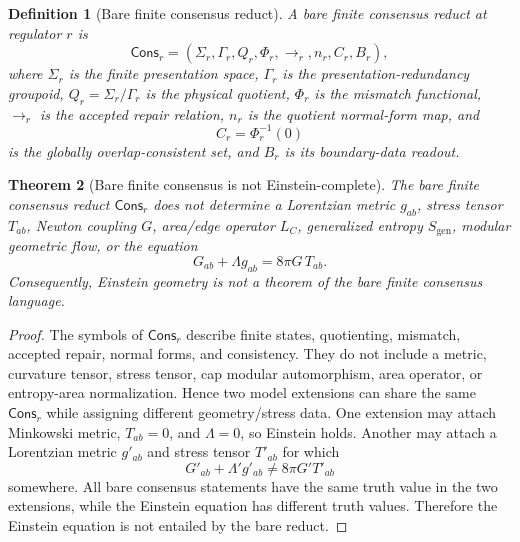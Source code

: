 \documentclass[11pt]{article}
\newtheorem{theorem}{Theorem}[section]
\newtheorem{definition}[theorem]{Definition}
\theoremstyle{remark}
\theoremstyle{plain}
\begin{document}
\begin{definition}[Bare finite consensus reduct]\label{def:bare-finite-consensus-reduct}
A bare finite consensus reduct at regulator \(r\) is
\[
\mathsf{Cons}_r
=
(\Sigma_r,\Gamma_r,Q_r,\Phi_r,\to_r,n_r,C_r,B_r),
\]
where \(\Sigma_r\) is the finite presentation space, \(\Gamma_r\) is the
presentation-redundancy groupoid, \(Q_r=\Sigma_r/\Gamma_r\) is the physical
quotient, \(\Phi_r\) is the mismatch functional, \(\to_r\) is the accepted
repair relation, \(n_r\) is the quotient normal-form map, and
\[
C_r=\Phi_r^{-1}(0)
\]
is the globally overlap-consistent set, and \(B_r\) is its boundary-data
readout.
\end{definition}

\begin{theorem}[Bare finite consensus is not Einstein-complete]
\label{thm:bare-consensus-not-einstein-complete}
The bare finite consensus reduct \(\mathsf{Cons}_r\) does not determine a
Lorentzian metric \(g_{ab}\), stress tensor \(T_{ab}\), Newton coupling \(G\),
area/edge operator \(L_C\), generalized entropy \(S_{\mathrm{gen}}\), modular
geometric flow, or the equation
\[
G_{ab}+\Lambda g_{ab}=8\pi G\,T_{ab}.
\]
Consequently, Einstein geometry is not a theorem of the bare finite consensus
language.
\end{theorem}

\begin{proof}
The symbols of \(\mathsf{Cons}_r\) describe finite states, quotienting,
mismatch, accepted repair, normal forms, and consistency. They do not include a
metric, curvature tensor, stress tensor, cap modular automorphism, area
operator, or entropy-area normalization. Hence two model extensions can share
the same \(\mathsf{Cons}_r\) while assigning different geometry/stress data.
One extension may attach Minkowski metric, \(T_{ab}=0\), and \(\Lambda=0\), so
Einstein holds. Another may attach a Lorentzian metric \(g'_{ab}\) and stress
tensor \(T'_{ab}\) for which
\[
G'_{ab}+\Lambda' g'_{ab}\ne 8\pi G' T'_{ab}
\]
somewhere. All bare consensus statements have the same truth value in the two
extensions, while the Einstein equation has different truth values. Therefore
the Einstein equation is not entailed by the bare reduct.
\end{proof}
\end{document}
